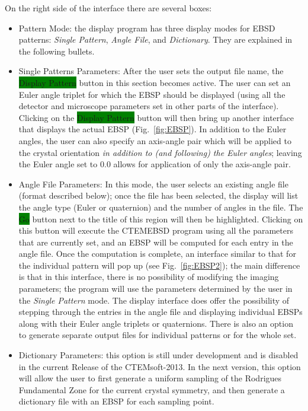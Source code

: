 \documentclass[DIV=calc, paper=letter, fontsize=11pt]{scrartcl}	 %
\newcommand{\ctp}{\textsf{CTEMsoft-2013}}
\newcommand{\button}[1]{\colorbox{green}{\textsf{#1}} button}
\begin{document}
On the right side of the interface there are several boxes:
\begin{itemize}
	\item \textsf{Pattern Mode}: the display program has three display modes for EBSD patterns: \textit{Single Pattern}, \textit{Angle File},
	and \textit{Dictionary}.  They are explained in the following bullets.
	\item \textsf{Single Patterns Parameters}: After the user sets the output file name, the \button{Display Pattern} in this section 
	becomes active.  The user can set an Euler angle triplet for which the EBSP should be displayed (using all the detector and microscope
	parameters set in other parts of the interface).  Clicking on the \button{Display Pattern} will then bring up another interface that 
	displays the actual EBSP (Fig.~\ref{fig:EBSP}).  In addition to the Euler angles, the user can also specify an axis-angle pair which will
	be applied to the crystal orientation \textit{in addition to (and following) the Euler angles};  leaving the Euler angle set to $0.0$ allows for application 
	of only the axis-angle pair.
	\item \textsf{Angle File Parameters}: In this mode, the user selects an existing angle file (format described below); once the file has been 
	selected, the display will list the angle type (Euler or quaternion) and the number of angles in the file.  The \button{Go} next to the 
	title of this region will then be highlighted.  Clicking on this button will execute the \textsf{CTEMEBSD} program using all the parameters 
	that are currently set, and an EBSP will be computed for each entry in the angle file.  Once the computation is complete, an interface similar
	to that for the individual pattern will pop up (see Fig.~\ref{fig:EBSP2}); the main difference is that in this interface, there is no possibility of modifying the 
	imaging parameters; the program will use the parameters determined by the user in the \textit{Single Pattern} mode.  The display interface
	does offer the possibility of stepping through the entries in the angle file and displaying individual EBSPs along with their Euler angle
	triplets or quaternions.  There is also an option to generate separate output files for individual patterns or for the whole set.  
	\item \textsf{Dictionary Parameters}: this option is still under development and is disabled in the current Release of the \ctp.  In the next version,
	this option will allow the user to first generate a uniform sampling of the Rodrigues Fundamental Zone for the current crystal symmetry, and then
	generate a dictionary file with an EBSP for each sampling point.  %
\end{itemize}
\end{document}
